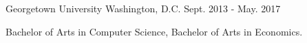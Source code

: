 \begin{cventries}
  \cventry
  {} %
  {Georgetown University} %
  {Washington, D.C.} %
  {Sept. 2013 - May. 2017} %
  {
    \vspace{-10mm}
    \begin{cvitems} %
      \item {Bachelor of Arts in Computer Science, Bachelor of Arts in Economics.}
    \end{cvitems}
  }
  \cventry
  {} %
  {} %
  {} %
  {} %
  {
    \vspace{-4mm}
  }
\end{cventries}
